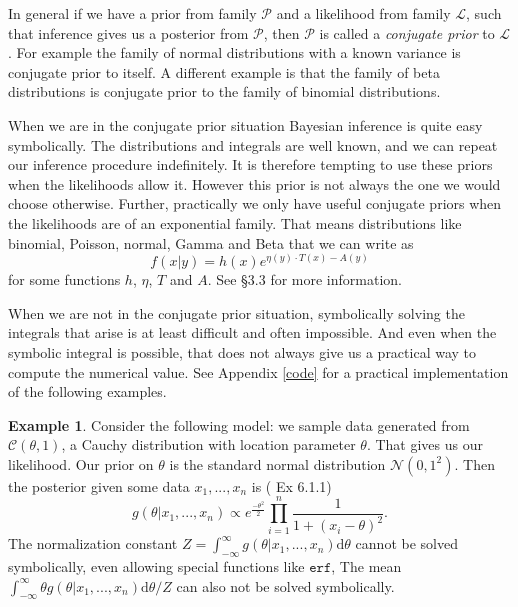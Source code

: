 \documentclass[12pt,vu]{adammath}
\theoremstyle{plain}
\theoremstyle{definition}
\newtheorem{example}[theorem]{Example}
\theoremstyle{remark}
\begin{document}
In general if we have a prior from family $\mathcal{P}$ and a likelihood from family $\mathcal{L}$, such that inference gives us a posterior from $\mathcal{P}$, then $\mathcal{P}$ is called a \emph{conjugate prior} to $\mathcal{L}$.
For example the family of normal distributions with a known variance is conjugate prior to itself.
A different example is that the family of beta distributions is conjugate prior to the family of binomial distributions.

When we are in the conjugate prior situation Bayesian inference is quite easy symbolically.
The distributions and integrals are well known, and we can repeat our inference procedure indefinitely.
It is therefore tempting to use these priors when the likelihoods allow it.
However this prior is not always the one we would choose otherwise.
Further, practically we only have useful conjugate priors when the likelihoods are of an exponential family.
That means distributions like binomial, Poisson, normal, Gamma and Beta that we can write as
$$f(x|y) = h(x) e^{\eta(y) \cdot T(x) - A(y)}$$
for some functions $h$, $\eta$, $T$ and $A$.
See \cite{bayesianchoice} \S 3.3 for more information.

When we are not in the conjugate prior situation, symbolically solving the integrals that arise is at least difficult and often impossible.
And even when the symbolic integral is possible, that does not always give us a practical way to compute the numerical value.
See Appendix \ref{code} for a practical implementation of the following examples.

\begin{mybox}
\begin{example}\label{cauchyexample}
Consider the following model: we sample data generated from $\mathcal{C}(\theta, 1)$, a Cauchy distribution with location parameter $\theta$.
That gives us our likelihood.
Our prior on $\theta$ is the standard normal distribution $\mathcal{N}(0, 1^2)$.
Then the posterior given some data $x_1, ..., x_n$ is (\cite{bayesianchoice} Ex 6.1.1)
$$g(\theta | x_1, ..., x_n) \propto e^\frac{-\theta^2}{2} \prod_{i=1}^n \frac{1}{1 + (x_i - \theta)^2}.$$
The normalization constant $Z = \int_{-\infty}^{\infty} g(\theta | x_1, ..., x_n) \mathrm{d} \theta$ cannot be solved symbolically, even allowing special functions like $\texttt{erf}$,
The mean $\int_{-\infty}^{\infty} \theta g(\theta | x_1, ..., x_n) \mathrm{d} \theta / Z$ can also not be solved symbolically.
\end{example}
\end{mybox}
\end{document}
